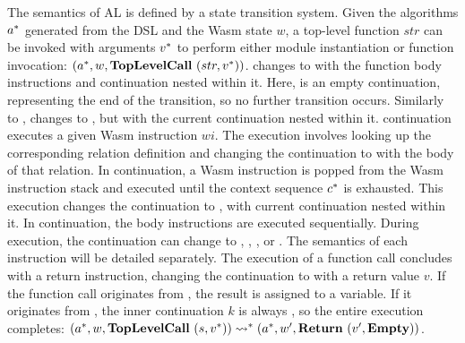 The semantics of AL is defined by a state transition system.
Given the algorithms $a^*$ generated from the DSL and the Wasm state $w$, a
top-level function $str$ can be invoked with arguments $v^*$ to perform
either module instantiation or function invocation:
$(a^*, w, \textbf{TopLevelCall} ~ (str, v^*))$.
\toplevelcall{} changes to \algo{} with the function body instructions and
\mt{} continuation nested within it.
Here, \mt{} is an empty continuation, representing the end of the transition,
so no further transition occurs.
Similarly to \toplevelcall{}, \call{} changes to \algo{}, but with the current
continuation nested within it.
\exe{} continuation executes a given Wasm instruction $wi$.
The execution involves looking up the corresponding relation definition and
changing the continuation to \algo{} with the body of that relation.
In \wasm{} continuation, a Wasm instruction is popped from the Wasm
instruction stack and executed until the context sequence $c^*$ is
exhausted.
This execution changes the continuation to \algo{}, with current continuation
nested within it.
In \algo{} continuation, the body instructions are executed sequentially.
During execution, the continuation can change to \call{}, \exe{}, \wasm{},
or \ret{}.
The semantics of each instruction will be detailed separately.
The execution of a function call concludes with a return instruction, changing
the continuation to \ret{} with a return value $v$.
If the function call originates from \call{}, the result is assigned to a
variable.
If it originates from \toplevelcall{}, the inner continuation $k$ is always
\mt, so the entire execution completes:
$
(a^*, w, \textbf{TopLevelCall} ~ (s, v^*))
\leadsto^*
(a^*, w', \textbf{Return} ~ (v', \textbf{Empty}))
$.





